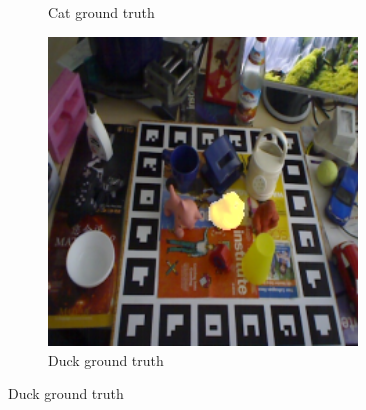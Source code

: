 \documentclass[../main.tex]{subfiles}
\begin{document}
\begin{figure}[H]
\begin{subfigure}[t]{0.19\textwidth}
        \caption{Cat ground truth}
        \label{subfig:cat_ground_truth}
    \end{subfigure}
    \begin{subfigure}[t]{0.19\textwidth}
        \centering
        \captionsetup{width=.9\textwidth}
        \includegraphics[width=0.9\textwidth]{figures/segmentation/duck_gt.png}
        \caption{Duck ground truth}
        \label{subfig:duck_ground_truth}
    \end{subfigure}


\end{figure}
\end{document}
